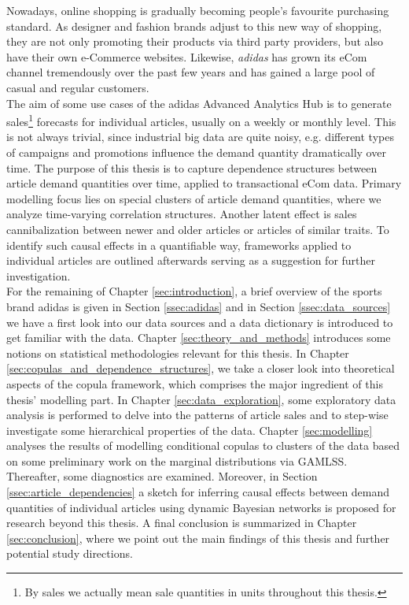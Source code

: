 

Nowadays, online shopping is gradually becoming people's favourite purchasing standard. As designer and fashion brands adjust to this new way of shopping, they are not only promoting their products via third party 	providers, but also have their own e-Commerce websites. Likewise, \textit{adidas} has grown its eCom channel tremendously over the past few years and has gained a large pool of casual and regular customers.
\\

The aim of some use cases of the adidas Advanced Analytics Hub is to generate sales\footnote{By sales we actually mean sale quantities in units throughout this thesis.} forecasts for individual articles, usually on a weekly or monthly level. This is not always trivial, since industrial big data are quite noisy, e.g. different types of campaigns and promotions influence the demand quantity dramatically over time. The purpose of this thesis is to capture dependence structures between article demand quantities over time, applied to transactional eCom data. Primary modelling focus lies on special clusters of article demand quantities, where we analyze time-varying correlation structures. Another latent effect is sales cannibalization between newer and older articles or articles of similar traits. To identify such causal effects in a quantifiable way, frameworks applied to individual articles are outlined afterwards serving as a suggestion for further investigation.
\\

For the remaining of Chapter \ref{sec:introduction}, a brief overview of the sports brand adidas is given in Section \ref{ssec:adidas} and in Section \ref{ssec:data_sources} we have a first look into our data sources and a data dictionary is introduced to get familiar with the data. Chapter \ref{sec:theory_and_methods} introduces some notions on statistical methodologies relevant for this thesis. In Chapter \ref{sec:copulas_and_dependence_structures}, we take a closer look into theoretical aspects of the copula framework, which comprises the major ingredient of this thesis' modelling part. In Chapter \ref{sec:data_exploration}, some exploratory data analysis is performed to delve into the patterns of article sales and to step-wise investigate some hierarchical properties of the data.  Chapter \ref{sec:modelling} analyses the results of modelling conditional copulas to clusters of the data based on some preliminary work on the marginal distributions via GAMLSS. Thereafter, some diagnostics are examined. Moreover, in Section \ref{ssec:article_dependencies} a sketch for inferring causal effects between demand quantities of individual articles using dynamic Bayesian networks is proposed for research beyond this thesis. A final conclusion is summarized in Chapter \ref{sec:conclusion}, where we point out the main findings of this thesis and further potential study directions.




